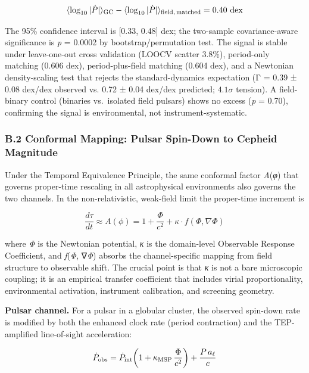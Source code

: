 \documentclass[
]{article}
\begin{document}
\begin{equation}
\langle \log_{10}|\dot{P}| \rangle_{\rm GC} - \langle \log_{10}|\dot{P}| \rangle_{\rm field,\,matched} = 0.40\ {\rm dex}
\end{equation}

The 95\% confidence interval is {[}0.33, 0.48{]} dex; the two-sample
covariance-aware significance is \emph{p} = 0.0002 by
bootstrap/permutation test. The signal is stable under leave-one-out
cross validation (LOOCV scatter 3.8\%), period-only matching (0.606
dex), period-plus-field matching (0.604 dex), and a Newtonian
density-scaling test that rejects the standard-dynamics expectation (Γ =
0.39 ± 0.08 dex/dex observed vs. 0.72 ± 0.04 dex/dex predicted;
\(4.1\sigma\) tension). A field-binary control (binaries vs.~isolated
field pulsars) shows no excess (\emph{p} = 0.70), confirming the signal
is environmental, not instrument-systematic.

\subsubsection{B.2 Conformal Mapping: Pulsar Spin-Down to Cepheid
Magnitude}\label{b.2-conformal-mapping-pulsar-spin-down-to-cepheid-magnitude}

Under the Temporal Equivalence Principle, the same conformal factor
\emph{A}(\emph{φ}) that governs proper-time rescaling in all
astrophysical environments also governs the two channels. In the
non-relativistic, weak-field limit the proper-time increment is

\begin{equation}
\frac{d\tau}{dt} \approx A(\phi) = 1 + \frac{\Phi}{c^2} + \kappa \cdot f(\Phi, \nabla\Phi)
\label{eq:proper_time}
\end{equation}

where \emph{Φ} is the Newtonian potential, \emph{κ} is the domain-level
Observable Response Coefficient, and \emph{f}(\emph{Φ}, ∇\emph{Φ})
absorbs the channel-specific mapping from field structure to observable
shift. The crucial point is that \emph{κ} is not a bare microscopic
coupling; it is an empirical transfer coefficient that includes virial
proportionality, environmental activation, instrument calibration, and
screening geometry.

\textbf{Pulsar channel.} For a pulsar in a globular cluster, the
observed spin-down rate is modified by both the enhanced clock rate
(period contraction) and the TEP-amplified line-of-sight acceleration:

\begin{equation}
\dot{P}_{\rm obs} = \dot{P}_{\rm int}\!\left(1 + \kappa_{\rm MSP}\,\frac{\Phi}{c^2}\right) + \frac{P\,a_\ell}{c}
\end{equation}
\end{document}
